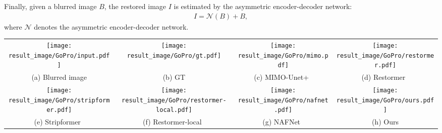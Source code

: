 \documentclass[10pt,twocolumn,letterpaper]{article}
\begin{document}
Finally, given a blurred image $B$, the restored image $I$ is estimated by the asymmetric encoder-decoder network:
\begin{equation}
\begin{split}
I = \mathcal{N}(B) + B,
\label{eq: latent-image}
\end{split}
\end{equation}
where $\mathcal{N}$ denotes the asymmetric encoder-decoder network.

\begin{figure*}[t]
\footnotesize
\centering
    \begin{tabular}{cccc}
    \texttt{[image: result\_image/GoPro/input.pdf]}&\hspace{-4.5mm}
    \texttt{[image: result\_image/GoPro/gt.pdf]}&\hspace{-4.5mm}
    \texttt{[image: result\_image/GoPro/mimo.pdf]}&\hspace{-4.5mm}
    \texttt{[image: result\_image/GoPro/restormer.pdf]}\\
    \hspace{-4.5mm}(a) Blurred image &\hspace{-4.5mm} (b) GT &\hspace{-4.5mm}(c) MIMO-Unet+~\cite{MIMO} &\hspace{-4.5mm}(d) Restormer~\cite{Restormer}\\
    \texttt{[image: result\_image/GoPro/stripformer.pdf]} &\hspace{-4.5mm}
    \texttt{[image: result\_image/GoPro/restormer-local.pdf]} &\hspace{-4.5mm}
    \texttt{[image: result\_image/GoPro/nafnet.pdf]} &\hspace{-4.5mm}
    \texttt{[image: result\_image/GoPro/ours.pdf]}\\
\hspace{-4.5mm} (e) Stripformer~\cite{Stripformer}  &\hspace{-4.5mm} (f) Restormer-local~\cite{TLC} &\hspace{-4.5mm} (g) NAFNet~\cite{NAFNet} &\hspace{-4.5mm} (h) Ours
    \end{tabular}
\vspace{-2mm}
    \caption{Deblurred results on the GoPro dataset~\cite{GoPro}. The deblurred results in (c)-(g) still contain significant blur effects. The proposed method generates a clearer image. For example, the characters and boundaries are much clearer.}
    \label{fig:GoPro_result}
\vspace{-4mm}
\end{figure*}
\end{document}

